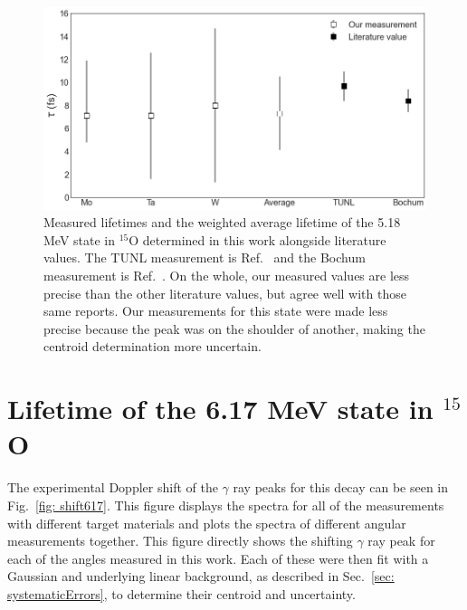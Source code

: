 \begin{figure}
\centering
\includegraphics[width=\linewidth]{figures/lifetimes518.png}
\caption{Measured lifetimes and the weighted average lifetime of the 5.18 MeV state in $^{15}$O determined in this work alongside literature values. The TUNL measurement is Ref.\ \cite{Bertone2001} and the Bochum measurement is Ref.\ \cite{Schurmann2008}. On the whole, our measured values are less precise than the other literature values, but agree well with those same reports. Our measurements for this state were made less precise because the peak was on the shoulder of another, making the centroid determination more uncertain.}
\label{fig: lifetimes518}
\end{figure}



\section{Lifetime of the 6.17 MeV state in $^{15}$O}
\label{sec: lifetime617}


The experimental Doppler shift of the $\gamma$ ray peaks for this decay can be seen in Fig.\ \ref{fig: shift617}. This figure displays the spectra for all of the measurements with different target materials and plots the spectra of different angular measurements together. This figure directly shows the shifting $\gamma$ ray peak for each of the angles measured in this work. Each of these were then fit with a Gaussian and underlying linear background, as described in Sec.\ \ref{sec: systematicErrors}, to determine their centroid and uncertainty. 


